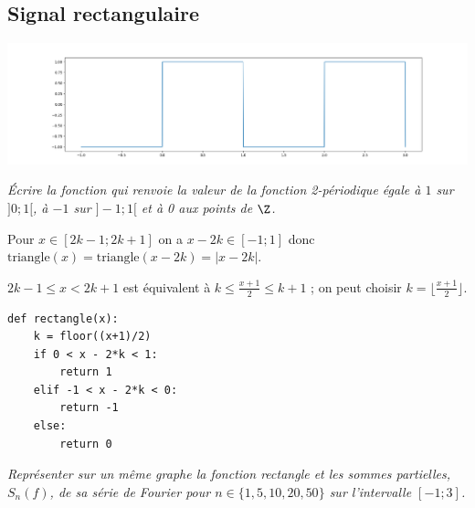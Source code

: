\subsection{Signal rectangulaire}
\begin{center}
\includegraphics[scale=0.3]{TP/Images/TP19_rectangle.png}
\end{center}
\begin{Exercise}\it
Écrire la fonction  qui renvoie la valeur de la fonction 2-périodique égale à $1$ sur $]0;1[$, à  $-1$ sur $]-1;1[$ et à 0 aux points de $\Z$.
\end{Exercise}
\begin{Answer} 

Pour $x\in [2k-1;2k+1]$ on a $x-2k\in [-1;1]$ donc
$\text{triangle}(x)  = \text{triangle}(x-2k)  = |x-2k|$.

$2k-1\le x < 2k+1$ est équivalent à $k \le \frac{x+1}2 \le k+1$ ; on peut choisir $k = \big\lfloor \frac{x+1}2 \big\rfloor$.
    
\begin{lstlisting}
def rectangle(x):
    k = floor((x+1)/2)
    if 0 < x - 2*k < 1:
        return 1
    elif -1 < x - 2*k < 0:
        return -1
    else:
        return 0
\end{lstlisting}
\newpage
\end{Answer}
\begin{Exercise}\it
Représenter sur un même graphe la fonction rectangle et les sommes partielles, $S_n(f)$, de sa série de Fourier pour $n\in \{1, 5, 10, 20, 50\}$ sur l'intervalle $[-1;3]$.
\end{Exercise}
